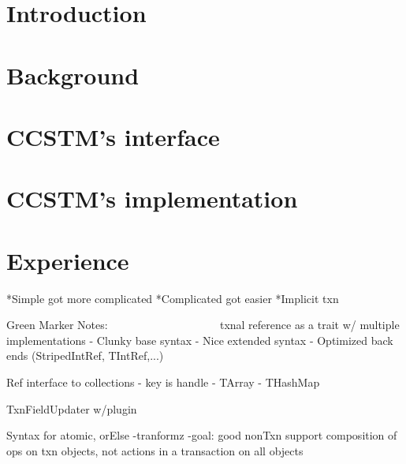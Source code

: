 \documentclass[preprint]{sigplanconf}
\newcommand{\codesec}[1]{{\fontsize{10}{12}\selectfont \tt \bfseries #1}}
\newcommand{\typesec}[1]{{\codesec{\itshape #1}}}
\newcommand{\typeparamsec}[1]{{\codesec{\bfseries #1}}}
\newcommand{\xtypesec}[2]{{\typesec{#1}\typeparamsec{[#2]}}}
\begin{document}

\terms
\xterms

\keywords
\xkeywords

\section{Introduction}
\label{sec:intro}


\section{Background}
\label{sec:library}


\section{CCSTM's interface}
\label{sec:ref}


\section{CCSTM's implementation}
\label{sec:impl}


\section{Experience}
%
*Simple got more complicated
*Complicated got easier
*Implicit txn


Green Marker Notes:
~~~~~~~~~~~~~~~~~~~
txnal reference as a trait
    w/ multiple implementations
  - Clunky base syntax
  - Nice extended syntax
  - Optimized back ends (StripedIntRef, TIntRef,...)

Ref interface to collections
  - key is handle
  - TArray
  - THashMap

TxnFieldUpdater w/plugin

Syntax for atomic, orElse
  -tranformz
  -goal: good nonTxn support
        composition of ops on txn objects, 
        not actions in a transaction on all objects
\end{document}
